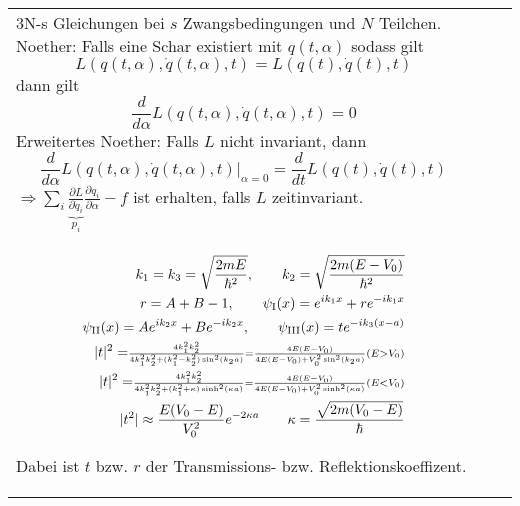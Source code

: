 \documentclass[landscape,8pt]{scrartcl}
\newcommand{\myheading}[1]{\noindent\textbf{#1}\\}
\begin{document}
\begin{tabular}{lll}
\begin{minipage}{0.3\linewidth}
3N-s Gleichungen bei $s$ Zwangsbedingungen und $N$ Teilchen.
Noether: Falls eine Schar existiert mit $q(t,\alpha)$ sodass gilt
\[L(q(t,\alpha),\dot q(t,\alpha),t) = L(q(t),\dot q(t),t)\]
dann gilt
\[ \frac{d}{d \alpha} L(q(t,\alpha),\dot q(t,\alpha), t) = 0\]
Erweitertes Noether: Falls $L$ nicht invariant, dann
\[\frac{d}{d\alpha} L(q(t,\alpha),\dot q(t,\alpha), t)|_{\alpha = 0}
= \frac{d}{dt}L(q(t),\dot q(t), t) \]
$\Rightarrow \sum\limits_i \underbrace{\frac{\partial L}{\partial \dot q_i}}_{p_i} \frac{\partial q_i}{\partial \alpha} - f$ ist erhalten, falls $L$ zeitinvariant.
\end{minipage}
&
\begin{minipage}{0.3\linewidth}
\myheading{Potentialbarriere}
{\begin{align*}
k_1 = k_3 = \sqrt{\frac{2mE}{\hbar^2}}, \qquad k_2 = \sqrt{\frac{2m(E-V_0)}{\hbar^2}} \\
r = A+B-1, \qquad \psi_\text I(x) = e^{ik_1x} + re^{-ik_1x} \\
\psi_\text{II}(x) = Ae^{ik_2x} + Be^{-ik_2x}, \qquad \psi_\text{III}(x) = t e^{-ik_3(x-a)} \\
|t|^2 = \scriptstyle{\frac{4k_1^2k_2^2}{4k_1^2k_2^2+(k_1^2-k_2^2)\sin^2(k_2a)}=\frac{4E(E-V_0)}{4E(E-V_0)+V_0^2\sin^2(k_2a)}} (E>V_0)\\
|t|^2 = \scriptstyle{\frac{4k_1^2k_2^2}{4k_1^2k_2^2+(k_1^2+\kappa)\sinh^2(\kappa a)}=\frac{4E(E-V_0)}{4E(E-V_0)+V_0^2\sinh^2(\kappa a)}} (E<V_0)\\
|t^2| \approx \frac{E(V_0 - E)}{V_0^2}e^{-2\kappa a} \qquad \kappa = \frac{\sqrt{2m(V_0 - E)}}{\hbar}
\end{align*}}

Dabei ist $t$ bzw. $r$ der Transmissions- bzw. Reflektionskoeffizent. 
\end{minipage}

\end{tabular}
\end{document}
